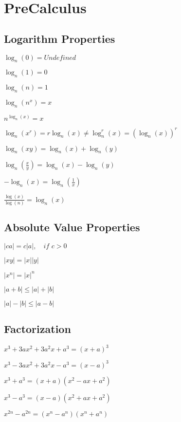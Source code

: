 \section*{PreCalculus}
\subsection*{Logarithm Properties}
\begin{eqlist}
	\item $\log_n(0) = \textit{Undefined}$
	\item $\log_n(1) = 0$
	\item $\log_n(n) = 1$
	\item $\log_n(n^x) = x$
	\item $n^{\log_n(x)} = x$
	\item $\log_n(x^r) = r\log_n(x) \neq \log_n^r(x) = (\log_n(x))^r$
	\item $\log_n(xy) = \log_n(x) + \log_n(y)$
	\item $\log_n\left(\frac{x}{y}\right) = \log_n(x) - \log_n(y)$
	\item $-\log_n(x) = \log_n\left(\frac{1}{x}\right)$
	\item $\frac{\log(x)}{\log(n)} = \log_n(x)$
\end{eqlist}


\subsection*{Absolute Value Properties} 
\begin{eqlist}
	\item $|ca| = c|a|, \quad \textit{if $c > 0$}$
	\item $|xy| = |x||y|$
	\item $|x^n| = |x|^n$
	\item $|a+b| \leq |a| + |b|$
	\item $|a|-|b| \leq |a-b|$ 
\end{eqlist}

\subsection*{Factorization}
\begin{eqlist}
	\item $x^3+3ax^2+3a^2x+a^3 = (x+a)^3$
	\item $x^3-3ax^2+3a^2x-a^3 = (x-a)^3$
	\item $x^3+a^3=(x+a)(x^2-ax+a^2)$
	\item $x^3-a^3=(x-a)(x^2+ax+a^2)$
	\item $x^{2n}-a^{2n}=(x^n-a^n)(x^n+a^n)$
\end{eqlist}
